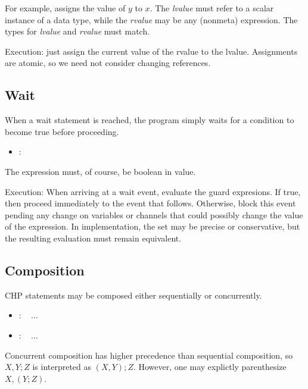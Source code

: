 \noindent
For example,  assigns the value of $y$ to $x$.  
The \emph{lvalue} must refer to a scalar instance of a data type, 
while the \emph{rvalue} may be any (nonmeta) expression.  
The types for \emph{lvalue} and \emph{rvalue} must match.  

Execution: just assign the current value of the rvalue to the lvalue.
Assignments are atomic, so we need not consider changing references.  

\subsection{Wait}
\label{sec:chp:stmts:wait}

When a wait statement is reached, the program simply waits for a condition
to become true before proceeding.  

\begin{itemize}
\item {} : \ttt{[}  \ttt{]}
\end{itemize}

The expression must, of course, be boolean in value.  

Execution: 
When arriving at a wait event, evaluate the guard expresions.
If true, then proceed immediately to the event that follows. 
Otherwise, block this event pending any change on variables or channels
that could possibly change the value of the expression.  
In implementation, the set may be precise or conservative, but 
the resulting evaluation must remain equivalent.  

\subsection{Composition}
\label{sec:chp:stmts:comp}

CHP statements may be composed either sequentially or concurrently.  

\begin{itemize}
\item {} :  \seq\  ...
\item {} :  \concur\  ...
\end{itemize}

Concurrent composition has higher precedence than sequential composition, 
so $X,Y;Z$ is interpreted as $(X,Y);Z$.  
However, one may explictly parenthesize $X,(Y;Z)$.  

